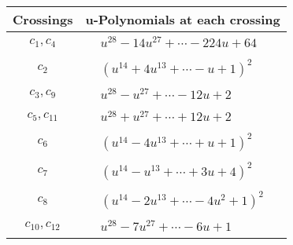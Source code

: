 \documentclass[1p]{elsarticle_modified}
\theoremstyle{definition}
\begin{document}
\begin{tabular}{m{50pt}|m{274pt}}
Crossings & \hspace{64pt}u-Polynomials at each crossing \\
\hline $$\begin{aligned}c_{1},c_{4}\end{aligned}$$&$\begin{aligned}
&u^{28}-14 u^{27}+\cdots-224 u+64
\end{aligned}$\\
\hline $$\begin{aligned}c_{2}\end{aligned}$$&$\begin{aligned}
&(u^{14}+4 u^{13}+\cdots- u+1)^{2}
\end{aligned}$\\
\hline $$\begin{aligned}c_{3},c_{9}\end{aligned}$$&$\begin{aligned}
&u^{28}- u^{27}+\cdots-12 u+2
\end{aligned}$\\
\hline $$\begin{aligned}c_{5},c_{11}\end{aligned}$$&$\begin{aligned}
&u^{28}+u^{27}+\cdots+12 u+2
\end{aligned}$\\
\hline $$\begin{aligned}c_{6}\end{aligned}$$&$\begin{aligned}
&(u^{14}-4 u^{13}+\cdots+u+1)^{2}
\end{aligned}$\\
\hline $$\begin{aligned}c_{7}\end{aligned}$$&$\begin{aligned}
&(u^{14}- u^{13}+\cdots+3 u+4)^{2}
\end{aligned}$\\
\hline $$\begin{aligned}c_{8}\end{aligned}$$&$\begin{aligned}
&(u^{14}-2 u^{13}+\cdots-4 u^2+1)^{2}
\end{aligned}$\\
\hline $$\begin{aligned}c_{10},c_{12}\end{aligned}$$&$\begin{aligned}
&u^{28}-7 u^{27}+\cdots-6 u+1
\end{aligned}$\\
\hline
\end{tabular}\\~\\
\end{document}
